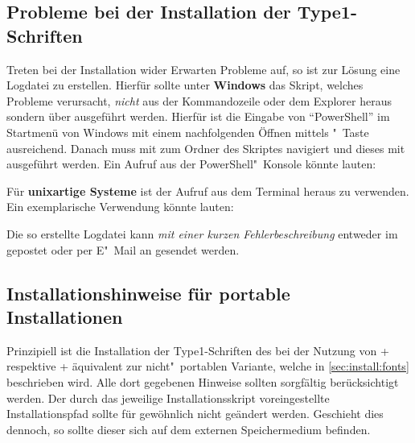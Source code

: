 \subsection{Probleme bei der Installation der Type1-Schriften}

Treten bei der Installation wider Erwarten Probleme auf, so ist zur Lösung eine 
Logdatei zu erstellen. Hierfür sollte unter \textbf{Windows} das Skript, 
welches Probleme verursacht, \emph{nicht} aus der Kommandozeile oder dem 
Explorer heraus sondern über  ausgeführt 
werden. Hierfür ist die Eingabe von \enquote{PowerShell} im Startmenü von 
Windows mit einem nachfolgenden Öffnen mittels "~Taste 
ausreichend. Danach muss mit  zum Ordner des Skriptes navigiert und 
dieses mit  
ausgeführt werden. Ein Aufruf aus der PowerShell"~Konsole könnte lauten:
%
\begin{quoting}
\RET*%
\RET%
\end{quoting}
%
Für \textbf{unixartige Systeme} ist der Aufruf 
 aus dem Terminal heraus zu 
verwenden. Ein exemplarische Verwendung könnte lauten:
%
\begin{quoting}
\RET*%
\RET%
\end{quoting}
%
Die so erstellte Logdatei kann \emph{mit einer kurzen Fehlerbeschreibung} 
entweder im \GitHubRepo gepostet oder per E"~Mail an \mailto{\TUDScriptContact}
gesendet werden.



\subsection{%
  Installationshinweise für portable Installationen%
  \label{sec:install:portable}%
}

Prinzipiell ist die Installation der Type1-Schriften des \CDs bei der Nutzung 
von \TeXLive+ respektive \MiKTeX+ äquivalent zur nicht"~portablen Variante, 
welche in \autoref{sec:install:fonts} beschrieben wird. Alle dort gegebenen 
Hinweise sollten sorgfältig berücksichtigt werden. Der durch das jeweilige 
Installationsskript voreingestellte Installationspfad sollte für gewöhnlich 
nicht geändert werden. Geschieht dies dennoch, so sollte dieser sich auf dem 
externen Speichermedium  befinden.


